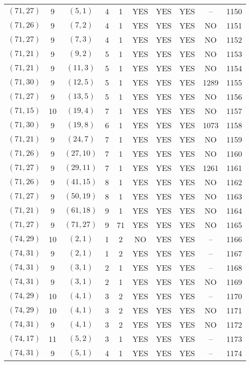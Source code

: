 \begin{longtable}{|c|c|c|c|c|c|c|c|c|c|}
$(71, 27)$ & 9 & $(5, 1)$ & 4 & 1 & YES & YES & YES & -- & 1150\\
$(71, 26)$ & 9 & $(7, 2)$ & 4 & 1 & YES & YES & YES & NO & 1151\\
$(71, 27)$ & 9 & $(7, 3)$ & 4 & 1 & YES & YES & YES & NO & 1152\\
$(71, 21)$ & 9 & $(9, 2)$ & 5 & 1 & YES & YES & YES & NO & 1153\\
$(71, 21)$ & 9 & $(11, 3)$ & 5 & 1 & YES & YES & YES & NO & 1154\\
$(71, 30)$ & 9 & $(12, 5)$ & 5 & 1 & YES & YES & YES & 1289 & 1155\\
$(71, 27)$ & 9 & $(13, 5)$ & 5 & 1 & YES & YES & YES & NO & 1156\\
$(71, 15)$ & 10 & $(19, 4)$ & 7 & 1 & YES & YES & YES & NO & 1157\\
$(71, 30)$ & 9 & $(19, 8)$ & 6 & 1 & YES & YES & YES & 1073 & 1158\\
$(71, 21)$ & 9 & $(24, 7)$ & 7 & 1 & YES & YES & YES & NO & 1159\\
$(71, 26)$ & 9 & $(27, 10)$ & 7 & 1 & YES & YES & YES & NO & 1160\\
$(71, 27)$ & 9 & $(29, 11)$ & 7 & 1 & YES & YES & YES & 1261 & 1161\\
$(71, 26)$ & 9 & $(41, 15)$ & 8 & 1 & YES & YES & YES & NO & 1162\\
$(71, 27)$ & 9 & $(50, 19)$ & 8 & 1 & YES & YES & YES & NO & 1163\\
$(71, 21)$ & 9 & $(61, 18)$ & 9 & 1 & YES & YES & YES & NO & 1164\\
$(71, 27)$ & 9 & $(71, 27)$ & 9 & 71 & YES & YES & YES & NO & 1165\\
$(74, 29)$ & 10 & $(2, 1)$ & 1 & 2 & NO & YES & YES & -- & 1166\\
$(74, 31)$ & 9 & $(2, 1)$ & 1 & 2 & YES & YES & YES & -- & 1167\\
$(74, 31)$ & 9 & $(3, 1)$ & 2 & 1 & YES & YES & YES & -- & 1168\\
$(74, 31)$ & 9 & $(3, 1)$ & 2 & 1 & YES & YES & YES & NO & 1169\\
$(74, 29)$ & 10 & $(4, 1)$ & 3 & 2 & YES & YES & YES & -- & 1170\\
$(74, 29)$ & 10 & $(4, 1)$ & 3 & 2 & YES & YES & YES & NO & 1171\\
$(74, 31)$ & 9 & $(4, 1)$ & 3 & 2 & YES & YES & YES & NO & 1172\\
$(74, 17)$ & 11 & $(5, 2)$ & 3 & 1 & YES & YES & YES & -- & 1173\\
$(74, 31)$ & 9 & $(5, 1)$ & 4 & 1 & YES & YES & YES & -- & 1174\\

\end{longtable}
